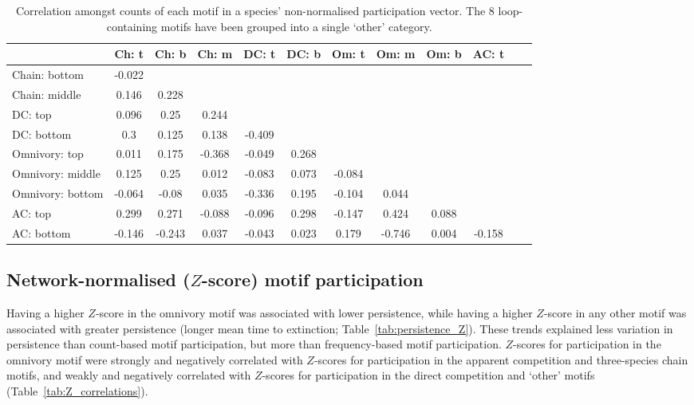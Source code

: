 \documentclass[12pt]{article}
\begin{document}
\begin{spacing}{2.0}
		\begin{table}[hb!]
    		\caption{Correlation amongst counts of each motif in a species' non-normalised participation vector. The 8 loop-containing motifs have been grouped into a single `other' category.}
    		\label{tab:position_freq_correlations}
    		\footnotesize
    		\begin{tabular}{l | c c c c c c c c c c c}    
        		&	Ch: t	&	Ch: b	&	Ch: m	&	DC: t	&	DC: b	&	Om: t	&	Om: m	&	Om: b	&	AC: t	\\
        		\hline
                Chain: bottom	&	-0.022	&		&		&		&		&		&		&		&		\\
                Chain: middle	&	0.146	&	0.228	&		&		&		&		&		&		&		\\
                DC: top	&	0.096	&	0.25	&	0.244	&		&		&		&		&		&		\\
                DC: bottom	&	0.3	&	0.125	&	0.138	&	-0.409	&		&		&		&		&		\\
                Omnivory: top	&	0.011	&	0.175	&	-0.368	&	-0.049	&	0.268	&		&		&		&		\\
                Omnivory: middle	&	0.125	&	0.25	&	0.012	&	-0.083	&	0.073	&	-0.084	&		&		&		\\
                Omnivory: bottom	&	-0.064	&	-0.08	&	0.035	&	-0.336	&	0.195	&	-0.104	&	0.044	&		&		\\
                AC: top	&	0.299	&	0.271	&	-0.088	&	-0.096	&	0.298	&	-0.147	&	0.424	&	0.088	&		\\
                AC: bottom	&	-0.146	&	-0.243	&	0.037	&	-0.043	&	0.023	&	0.179	&	-0.746	&	0.004	&	-0.158	\\
                \hline
            \end{tabular}
            \end{table}


	\subsection*{Network-normalised ($Z$-score) motif participation}

		Having a higher $Z$-score in the omnivory motif was associated with lower persistence, while having a higher $Z$-score in any other motif was associated with greater persistence (longer mean time to extinction; Table~\ref{tab:persistence_Z}).
		These trends explained less variation in persistence than count-based motif participation, but more than frequency-based motif participation.
		$Z$-scores for participation in the omnivory motif were strongly and negatively correlated with $Z$-scores for participation in the apparent competition and three-species chain motifs, and weakly and negatively correlated with $Z$-scores for participation in the direct competition and `other' motifs (Table~\ref{tab:Z_correlations}).



\end{spacing}
\end{document}
